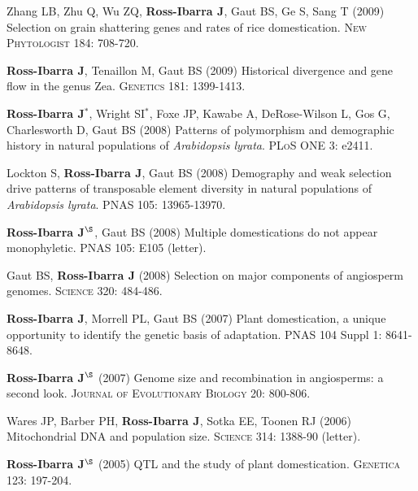 \documentclass[letterpaper]{article}
\begin{document}
\begin{etaremune}
\item Zhang LB, Zhu Q, Wu ZQ, {\bf Ross-Ibarra J}, Gaut BS, Ge S, Sang T (2009) Selection on grain shattering genes and rates of rice domestication.  \textsc{New Phytologist} 184: 708-720.
\item {\bf Ross-Ibarra J}, Tenaillon M, Gaut BS (2009) Historical divergence and gene flow in the genus Zea.  \textsc{Genetics} 181: 1399-1413.

\item {\bf Ross-Ibarra J}$^*$, Wright SI$^*$, Foxe JP, Kawabe A, DeRose-Wilson L, Gos G, Charlesworth D, Gaut BS (2008) Patterns of polymorphism and demographic history in natural populations of \emph{Arabidopsis lyrata}.  \textsc{PLoS ONE} 3: e2411.

\item Lockton S, {\bf Ross-Ibarra J}, Gaut BS (2008) Demography and weak selection drive patterns of transposable element diversity in natural populations of \emph{Arabidopsis lyrata}. PNAS 105: 13965-13970.

\item {\bf Ross-Ibarra J}$^\S$, Gaut BS (2008) Multiple domestications do not appear monophyletic. PNAS 105: E105 (letter).

\item Gaut BS, {\bf Ross-Ibarra J} (2008) Selection on major components of angiosperm genomes.  \textsc{Science} 320: 484-486.

\item {\bf Ross-Ibarra J}, Morrell PL, Gaut BS (2007) Plant domestication, a unique opportunity to identify the genetic basis of adaptation. PNAS 104 Suppl 1: 8641-8648. 

\item {\bf Ross-Ibarra J}$^\S$ (2007) Genome size and recombination in angiosperms: a second look.  \textsc{Journal of Evolutionary Biology} 20: 800-806.

\item Wares JP, Barber PH, {\bf Ross-Ibarra J}, Sotka EE, Toonen RJ (2006) Mitochondrial DNA and population size.  \textsc{Science} 314: 1388-90 (letter).

\item {\bf Ross-Ibarra J}$^\S$ (2005) QTL and the study of plant domestication.  \textsc{Genetica} 123: 197-204. 


\end{etaremune}
\end{document}
